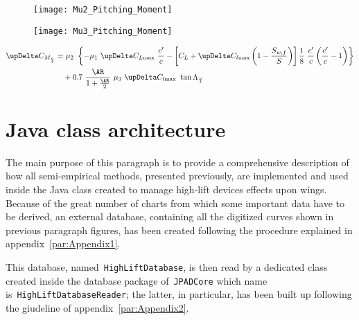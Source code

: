 \begin{figure}[!t]
\centering
\begin{minipage}{.5\textwidth}
  \centering
  \texttt{[image: Mu2\_Pitching\_Moment]}
  \label{fig:Mu2}
\end{minipage}%
\begin{minipage}{.5\textwidth}
  \centering
  \texttt{[image: Mu3\_Pitching\_Moment]}
  \label{fig:Mu3}
\end{minipage}
\end{figure}

\begin{equation}
\begin{split}
\upDelta C_{M_{\frac{c}{4}}}&=\mu_2\ \left\{-\mu_1\ \upDelta C_{L\text{max}}\ \dfrac{c'}{c}-\left[C_L+\upDelta C_{l\text{max}}\left(1-\dfrac{S_{w,f}}{S}\right)\right]\dfrac{1}{8}\ \dfrac{c'}{c}\left(\dfrac{c'}{c}-1\right)\right\}\\
&\quad+0.7\ \dfrac{\AR}{1+\frac{\AR}{2}}\ \mu_3\ \upDelta C_{l\text{max}}\ \tan\Lambda_{\frac{c}{4}}
\label{eqn:DeltaCMPractical}
\end{split}
\end{equation}

\section{Java class architecture}
The main purpose of this paragraph is to provide a comprehensive description of how all semi-empirical methods, presented previously, are implemented and used inside the Java class created to manage high-lift devices effects upon wings. Because of the great number of charts from which some important data have to be derived, an external database, containing all the digitized curves shown in previous paragraph figures, has been created following the procedure explained in appendix~\ref{par:Appendix1}.

\bigskip
\noindent
This database, named~\lstinline[language=Java]!HighLiftDatabase!, is then read by a dedicated class created inside the database package of~\lstinline[language=Java]!JPADCore! which name is~\lstinline[language=Java]!HighLiftDatabaseReader!; the latter, in particular, has been built up following the giudeline of appendix~\ref{par:Appendix2}.

